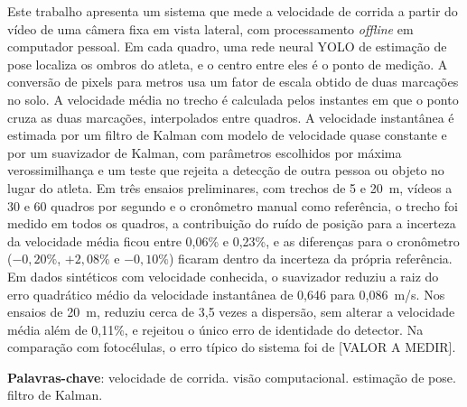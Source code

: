 \documentclass[
    12pt,               %
    openright,          %
    twoside,            %
    a4paper,            %
    chapter=TITLE,      %
    english,            %
    brazil              %
    ]{abntex2}
\begin{document}
\frenchspacing

\pretextual

\imprimircapa

\imprimirfolhaderosto*

\begin{resumo}
Este trabalho apresenta um sistema que mede a velocidade de corrida a partir do vídeo de uma câmera fixa em vista lateral, com processamento \textit{offline} em computador pessoal. Em cada quadro, uma rede neural YOLO de estimação de pose localiza os ombros do atleta, e o centro entre eles é o ponto de medição. A conversão de pixels para metros usa um fator de escala obtido de duas marcações no solo. A velocidade média no trecho é calculada pelos instantes em que o ponto cruza as duas marcações, interpolados entre quadros. A velocidade instantânea é estimada por um filtro de Kalman com modelo de velocidade quase constante e por um suavizador de Kalman, com parâmetros escolhidos por máxima verossimilhança e um teste que rejeita a detecção de outra pessoa ou objeto no lugar do atleta. Em três ensaios preliminares, com trechos de 5 e 20~m, vídeos a 30 e 60 quadros por segundo e o cronômetro manual como referência, o trecho foi medido em todos os quadros, a contribuição do ruído de posição para a incerteza da velocidade média ficou entre 0,06\% e 0,23\%, e as diferenças para o cronômetro ($-0{,}20\%$, $+2{,}08\%$ e $-0{,}10\%$) ficaram dentro da incerteza da própria referência. Em dados sintéticos com velocidade conhecida, o suavizador reduziu a raiz do erro quadrático médio da velocidade instantânea de 0,646 para 0,086~m/s. Nos ensaios de 20~m, reduziu cerca de 3,5 vezes a dispersão, sem alterar a velocidade média além de 0,11\%, e rejeitou o único erro de identidade do detector. Na comparação com fotocélulas, o erro típico do sistema foi de [VALOR A MEDIR].

\textbf{Palavras-chave}: velocidade de corrida. visão computacional. estimação de pose. filtro de Kalman.
\end{resumo}
\end{document}
